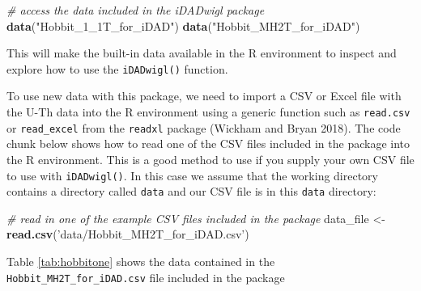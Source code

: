 \documentclass[]{elsarticle} %
\newenvironment{Shaded}{\begin{snugshade}}{\end{snugshade}}
\newcommand{\CommentTok}[1]{\textcolor[rgb]{0.56,0.35,0.01}{\textit{#1}}}
\newcommand{\KeywordTok}[1]{\textcolor[rgb]{0.13,0.29,0.53}{\textbf{#1}}}
\newcommand{\NormalTok}[1]{#1}
\newcommand{\StringTok}[1]{\textcolor[rgb]{0.31,0.60,0.02}{#1}}
\begin{document}
\begin{Shaded}
\begin{Highlighting}[]
\CommentTok{# access the data included in the iDADwigl package}
\KeywordTok{data}\NormalTok{(}\StringTok{"Hobbit_1_1T_for_iDAD"}\NormalTok{)}
\KeywordTok{data}\NormalTok{(}\StringTok{"Hobbit_MH2T_for_iDAD"}\NormalTok{)}
\end{Highlighting}
\end{Shaded}

This will make the built-in data available in the R environment to inspect and explore how to use the \texttt{iDADwigl()} function.

To use new data with this package, we need to import a CSV or Excel file with the U-Th data into the R environment using a generic function such as \texttt{read.csv} or \texttt{read\_excel} from the \texttt{readxl} package (Wickham and Bryan 2018). The code chunk below shows how to read one of the CSV files included in the package into the R environment. This is a good method to use if you supply your own CSV file to use with \texttt{iDADwigl()}. In this case we assume that the working directory contains a directory called \texttt{data} and our CSV file is in this \texttt{data} directory:

\begin{Shaded}
\begin{Highlighting}[]
\CommentTok{# read in one of the example CSV files included in the package}
\NormalTok{data_file <-}
\StringTok{  }\KeywordTok{read.csv}\NormalTok{(}\StringTok{'data/Hobbit_MH2T_for_iDAD.csv'}\NormalTok{)}
\end{Highlighting}
\end{Shaded}

\newpage

Table \ref{tab:hobbitone} shows the data contained in the \texttt{Hobbit\_MH2T\_for\_iDAD.csv} file included in the package
\end{document}
